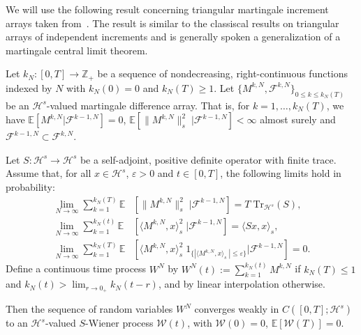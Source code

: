 We will use the following result concerning triangular martingale increment arrays taken from~\autocite{Berger1986}. The result is similar to the classiscal results on triangular arrays of independent increments and is generally spoken a generalization of a martingale central limit theorem.

Let $ k_{N}: [0,T] \to \mathbb{Z}_{+} $ be a sequence of nondecreasing, right-continuous functions indexed by $ N $ with $ k_{N}(0) = 0 $ and  $k_{N} (T) \geq 1 $. Let $ \{ M^{k,N}, \mathcal{F}^{k,N}  \}_{0 \leq k \leq k_{N}(T)} $ be an $ \mathcal{H}^s $-valued martingale difference array. That is, for $ k = 1,\dots , k_{N}(T) $, we have
$  \mathbb{E} \left[  M^{k,N} | \mathcal{F}^{k-1,N} \right] =  0 $,  $  \mathbb{E} \left[ \| M^{k,N} \|_{s}^{2} \; | \mathcal{F}^{k-1,N} \right] <  \infty $ almost surely
and $ \mathcal{F}^{k-1,N} \subset \mathcal{F}^{k,N} $.

\begin{proposition}\autocite[Theorem 5.1]{Berger1986}
\label{Martingale central limit theorem - Helping proposition}
  Let $ S : \mathcal{H}^s \to \mathcal{H}^s $ be a self-adjoint, positive definite operator with finite trace. Assume that, for all $ x \in \mathcal{H}^s $, $ \varepsilon > 0 $ and $ t \in [0,T] $, the following limits hold in probability:
  \begin{align}
   \lim_{N \to \infty} \sum_{k=1}^{k_{N}(T)} \mathbb{E} &\left[ \| M^{k,N} \|_{s}^{2}  \; | \mathcal{F}^{k-1,N} \right] = T \; \text{Tr}_{\mathcal{H}^s}(S), \label{MCLT - P1}\\
   \lim_{N \to \infty} \sum_{k=1}^{k_{N}(t)} \mathbb{E} &\left[ \langle  M^{k,N} , x \rangle_{s}^{2}  \; | \mathcal{F}^{k-1,N} \right] = \langle Sx , x \rangle_{s}, \label{MCLT - P2}\\
   \lim_{N \to \infty} \sum_{k=1}^{k_{N}(T)} \mathbb{E} &\left[ \langle M^{k,N} , x \rangle_{s}^{2} \; 1_{\{ | \langle M^{k,N} , x \rangle_s \; | \leq \varepsilon \}} | \mathcal{F}^{k-1,N} \right] = 0. \label{MCLT - P3}
  \end{align}
  Define a continuous time process $ W^{N} $ by $ W^{N}(t) := \sum_{k=1}^{k_{N}(t)} M^{k,N} $ if $ k_{N}(T) \leq 1 $ and $ k_{N}(t) > \lim_{r \to 0_+} k_N(t-r) $, and by linear interpolation otherwise.
  
  Then the sequence of random variables $ W^N $ converges weakly in $ C \left( [0,T]; \mathcal{H}^s \right) $ to an $ \mathcal{H}^s $-valued $S$-Wiener process $\mathcal{W}(t)$, with $ \mathcal{W}(0) = 0 $, $ \mathbb{E} [ \mathcal{W}(T) ] =  0 $.
  
\end{proposition}

